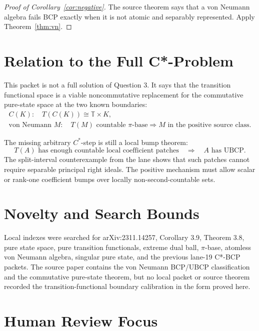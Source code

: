 \documentclass[11pt]{article}
\newcommand{\T}{\mathbb T}
\begin{document}
\begin{proof}[Proof of Corollary~\ref{cor:negative}]
The source theorem says that a von Neumann algebra fails BCP exactly when it
is not atomic and separably represented.  Apply Theorem~\ref{thm:vn}.
\end{proof}

\section*{Relation to the Full C*-Problem}

This packet is not a full solution of Question 3.  It says that the transition
functional space is a viable noncommutative replacement for the commutative
pure-state space at the two known boundaries:
\[
\begin{array}{c}
        C(K):\quad T(C(K))\cong \T\times K,\\[2mm]
        \text{von Neumann }M:\quad
        T(M)\text{ countable }\pi\text{-base}
        \Rightarrow M\text{ in the positive source class.}
\end{array}
\]

The missing arbitrary \(C^*\)-step is still a local bump theorem:
\[
        T(A)\text{ has enough countable local coefficient patches}
        \quad\Longrightarrow\quad
        A\text{ has UBCP}.
\]
The split-interval counterexample from the lane shows that such patches
cannot require separable principal right ideals.  The positive mechanism must
allow scalar or rank-one coefficient bumps over locally non-second-countable
sets.

\section*{Novelty and Search Bounds}

Local indexes were searched for arXiv:2311.14257, Corollary 3.9, Theorem
3.8, pure state space, pure transition functionals, extreme dual ball,
\(\pi\)-base, atomless von Neumann algebra, singular pure state, and the
previous lane-19 C*-BCP packets.  The source paper contains the von Neumann
BCP/UBCP classification and the commutative pure-state theorem, but no local
packet or source theorem recorded the transition-functional boundary
calibration in the form proved here.

\section*{Human Review Focus}
\end{document}
